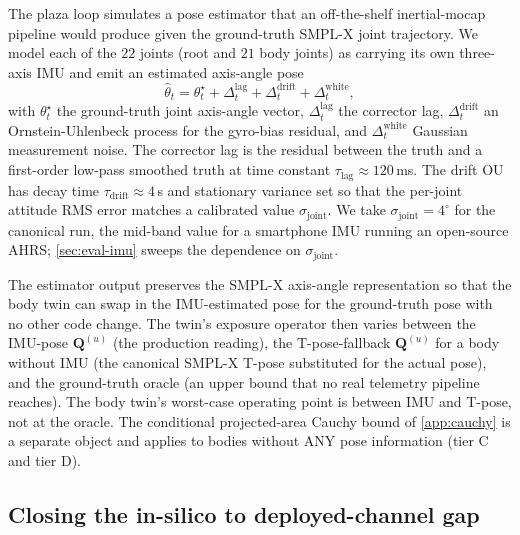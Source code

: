 \documentclass[journal,twocolumn,10pt]{IEEEtran}
\theoremstyle{plain}
\theoremstyle{remark}
\newcommand{\Qmat}{\mathbf{Q}}
\begin{document}
The plaza loop simulates a pose estimator that an off-the-shelf
inertial-mocap pipeline would produce given the ground-truth
SMPL-X joint trajectory. We model each of the $22$ joints (root and
$21$ body joints) as carrying its own three-axis IMU and emit an
estimated axis-angle pose
\begin{equation}\label{eq:imu-pose}
  \hat\theta_t = \theta^\star_t + \Delta_t^{\mathrm{lag}}
  + \Delta_t^{\mathrm{drift}} + \Delta_t^{\mathrm{white}},
\end{equation}
with $\theta^\star_t$ the ground-truth joint axis-angle vector,
$\Delta_t^{\mathrm{lag}}$ the corrector lag, $\Delta_t^{\mathrm{drift}}$
an Ornstein-Uhlenbeck process for the gyro-bias residual, and
$\Delta_t^{\mathrm{white}}$ Gaussian measurement noise. The
corrector lag is the residual between the truth and a first-order
low-pass smoothed truth at time constant $\tau_{\mathrm{lag}} \approx
120\,$ms. The drift OU has decay time $\tau_{\mathrm{drift}} \approx
4\,$s and stationary variance set so that the per-joint attitude
RMS error matches a calibrated value $\sigma_{\mathrm{joint}}$. We
take $\sigma_{\mathrm{joint}} = 4^\circ$ for the canonical run, the
mid-band value for a smartphone IMU running an open-source AHRS;
\cref{sec:eval-imu} sweeps the dependence on $\sigma_{\mathrm{joint}}$.

The estimator output preserves the SMPL-X axis-angle representation
so that the body twin can swap in the IMU-estimated pose for the
ground-truth pose with no other code change. The
twin's exposure operator then varies between the IMU-pose
$\Qmat^{(u)}$ (the production reading), the T-pose-fallback
$\Qmat^{(u)}$ for a body without IMU (the canonical SMPL-X T-pose
substituted for the actual pose), and the ground-truth oracle
(an upper bound that no real telemetry pipeline reaches). The
body twin's worst-case operating point is between IMU and T-pose,
not at the oracle. The conditional projected-area Cauchy bound of
\cref{app:cauchy} is a separate object and applies to bodies
without ANY pose information (tier C and tier D).

\subsection{Closing the in-silico to deployed-channel gap}\label{sec:csi-cal}
\end{document}
